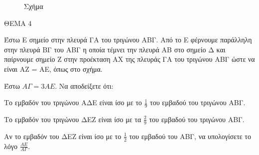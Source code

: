 \begin{figure}
\caption*{Σχήμα}
\end{figure}
ΘΕΜΑ 4

Έστω E σημείο στην πλευρά ΓΑ του τριγώνου ΑΒΓ. Από το E φέρνουμε παράλληλη στην πλευρά ΒΓ του ΑΒΓ η οποία τέμνει την πλευρά ΑΒ στο σημείο Δ και παίρνουμε σημείο Z στην προέκταση ΑX της πλευράς ΓΑ του τριγώνου ΑΒΓ ώστε να είναι ΑZ = ΑΕ, όπως στο σχήμα.

\begin{alist}
\item Έστω $A\Gamma = 3AE$. Να αποδείξετε ότι:
    \begin{rlist}
    \item Το εμβαδόν του τριγώνου ΑΔΕ είναι ίσο με το $\frac{1}{9}$ του εμβαδού του τριγώνου ΑΒΓ. 
    \item Το εμβαδόν του τριγώνου ΔΕΖ είναι ίσο με τα $\frac{2}{9}$ του εμβαδού του τριγώνου ΑΒΓ. 
    \end{rlist}
\item Αν το εμβαδόν του ΔΕΖ είναι ίσο με το $\frac{1}{2}$ του εμβαδού του ΑΒΓ, να υπολογίσετε το λόγο $\frac{AE}{A\Gamma}$. 
\end{alist}